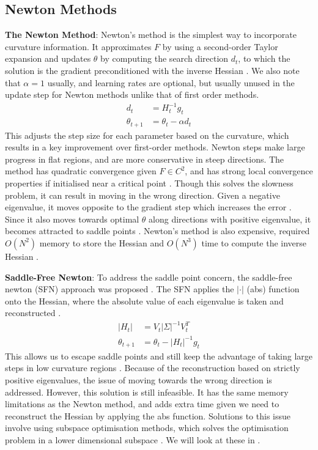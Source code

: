 \subsection{Newton Methods} \label{sec:newton_methods}
\textbf{The Newton Method}: Newton's method is the simplest way to incorporate curvature information. It approximates $F$ by using a second-order Taylor expansion and updates $\theta$ by computing the search direction $d_t$, to which the solution is the gradient preconditioned with the inverse Hessian \citep{NoceWrig06}. We also note that $\alpha = 1$ usually, and learning rates are optional, but usually unused in the update step for Newton methods unlike that of first order methods.
\begin{align}
    d_t &= H_t^{-1} g_t \\
    \theta_{t+1} &= \theta_t - \alpha d_t
\end{align}
This adjusts the step size for each parameter based on the curvature, which results in a key improvement over first-order methods. Newton steps make large progress in flat regions, and are more conservative in steep directions. The method has quadratic convergence given $F \in C^{2}$, and has strong local convergence properties if initialised near a critical point \citep{NoceWrig06}. Though this solves the slowness problem, it can result in moving in the wrong direction. Given a negative eigenvalue, it moves opposite to the gradient step which increases the error \citep{dauphin2014sfn}. Since it also moves towards optimal $\theta$ along directions with positive eigenvalue, it becomes attracted to saddle points \citep{dauphin2014sfn}.
Newton's method is also expensive, required $O(N^2)$ memory to store the Hessian and $O(N^3)$ time to compute the inverse Hessian \citep{NoceWrig06}.

\textbf{Saddle-Free Newton}: To address the saddle point concern, the saddle-free newton (SFN) approach was proposed \citep{dauphin2014sfn}. The SFN applies the $|\cdot|$ (abs) function onto the Hessian, where the absolute value of each eigenvalue is taken and reconstructed \citep{dauphin2014sfn}.
\begin{align}
    |H_t| &= V_{t} |\Sigma|^{-1} V_{t}^T \\
    \theta_{t+1} &= \theta_t - |H_t|^{-1} g_t
\end{align}
This allows us to escape saddle points and still keep the advantage of taking large steps in low curvature regions \citep{dauphin2014sfn}. Because of the reconstruction based on strictly positive eigenvalues, the issue of moving towards the wrong direction is addressed. However, this solution is still infeasible. It has the same memory limitations as the Newton method, and adds extra time given we need to reconstruct the Hessian by applying the abs function. Solutions to this issue involve using subspace optimisation methods, which solves the optimisation problem in a lower dimensional subspace \citep{dauphin2014sfn}. We will look at these in .

